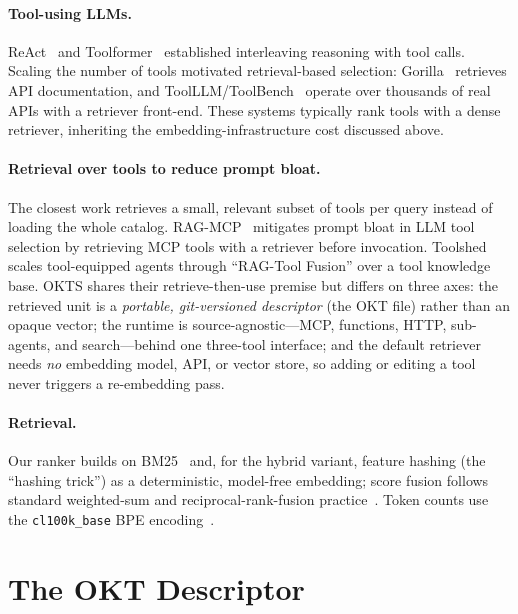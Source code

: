 \documentclass[11pt]{article}
\begin{document}
\paragraph{Tool-using LLMs.} ReAct~\citep{yao2023react} and
Toolformer~\citep{schick2023toolformer} established interleaving reasoning with
tool calls. Scaling the number of tools motivated retrieval-based selection:
Gorilla~\citep{patil2023gorilla} retrieves API documentation, and
ToolLLM/ToolBench~\citep{qin2023toolllm} operate over thousands of real APIs with
a retriever front-end. These systems typically rank tools with a dense retriever,
inheriting the embedding-infrastructure cost discussed above.

\paragraph{Retrieval over tools to reduce prompt bloat.} The closest work
retrieves a small, relevant subset of tools per query instead of loading the
whole catalog. RAG-MCP~\citep{ragmcp} mitigates prompt bloat in LLM tool
selection by retrieving MCP tools with a retriever before invocation.
Toolshed~\citep{toolshed} scales tool-equipped agents through ``RAG-Tool
Fusion'' over a tool knowledge base. OKTS shares their retrieve-then-use premise
but differs on three axes: the retrieved unit is a \emph{portable, git-versioned
descriptor} (the OKT file) rather than an opaque vector; the runtime is
source-agnostic---MCP, functions, HTTP, sub-agents, and search---behind one
three-tool interface; and the default retriever needs \emph{no} embedding model,
API, or vector store, so adding or editing a tool never triggers a re-embedding
pass.

\paragraph{Retrieval.} Our ranker builds on BM25~\citep{robertson2009bm25} and,
for the hybrid variant, feature hashing (the ``hashing trick'')
\citep{weinberger2009hashing} as a deterministic, model-free embedding; score
fusion follows standard weighted-sum and reciprocal-rank-fusion
practice~\citep{cormack2009rrf}. Token counts use the \texttt{cl100k\_base} BPE
encoding~\citep{tiktoken}.

\section{The OKT Descriptor}
\label{sec:okt}
\end{document}
